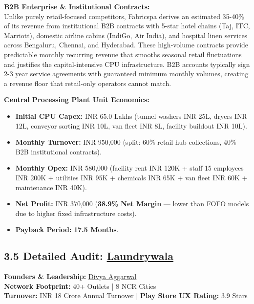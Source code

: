 \documentclass[11pt,a4paper]{article}
\begin{document}
\vspace{0.4cm}
\textbf{B2B Enterprise \& Institutional Contracts:}\\
Unlike purely retail-focused competitors, Fabricspa derives an estimated 35-40\% of its revenue from institutional B2B contracts with 5-star hotel chains (Taj, ITC, Marriott), domestic airline cabins (IndiGo, Air India), and hospital linen services across Bengaluru, Chennai, and Hyderabad. These high-volume contracts provide predictable monthly recurring revenue that smooths seasonal retail fluctuations and justifies the capital-intensive CPU infrastructure. B2B accounts typically sign 2-3 year service agreements with guaranteed minimum monthly volumes, creating a revenue floor that retail-only operators cannot match.

\vspace{0.4cm}
\textbf{Central Processing Plant Unit Economics:}
\begin{itemize}
    \item \textbf{Initial CPU Capex:} INR 65.0 Lakhs (tunnel washers INR 25L, dryers INR 12L, conveyor sorting INR 10L, van fleet INR 8L, facility buildout INR 10L).
    \item \textbf{Monthly Turnover:} INR 950,000 (split: 60\% retail hub collections, 40\% B2B institutional contracts).
    \item \textbf{Monthly Opex:} INR 580,000 (facility rent INR 120K + staff 15 employees INR 200K + utilities INR 95K + chemicals INR 65K + van fleet INR 60K + maintenance INR 40K).
    \item \textbf{Net Profit:} INR 370,000 (\textbf{38.9\% Net Margin} --- lower than FOFO models due to higher fixed infrastructure costs).
    \item \textbf{Payback Period:} \textbf{17.5 Months}.
\end{itemize}

\clearpage

\subsection{3.5 Detailed Audit: \href{https://laundrywala.in}{\underline{Laundrywala}}}
\textbf{Founders \& Leadership:} \href{https://www.linkedin.com/in/divya-aggarwal-8910a221/}{\underline{Divya Aggarwal}}\\
\textbf{Network Footprint:} 40+ Outlets | 8 NCR Cities\\
\textbf{Turnover:} INR 18 Crore Annual Turnover | \textbf{Play Store UX Rating:} 3.9 Stars
\end{document}
